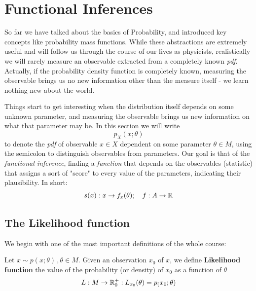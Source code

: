 \chapter{Functional Inferences}
So far we have talked about the basics of Probability, and introduced key concepts like probability mass functions. While these abstractions are extremely useful and will follow us through the course of our lives as physicists, realistically we will rarely measure an observable extracted from a completely known \emph{pdf}. Actually, if the probability density function is completely known, measuring the observable brings us no new information other than the measure itself - we learn nothing new about the world. 

Things start to get interesting when the distribution itself depends on some unknown parameter, and measuring the observable brings us new information on what that parameter may be. In this section we will write
	\[
	p_X(x;\theta)
	\]
to denote the \emph{pdf} of observable $x\in X$ dependent on some parameter $\theta\in M$, using the semicolon to distinguish observables from parameters. Our goal is that of the \emph{functional inference}, finding a \emph{function} that depends on the observables (statistic) that assigns a sort of "score" to every value of the parameters, indicating their plausibility. In short:
	\[
	s(x): x\rightarrow f_x(\theta); \quad f:A\rightarrow \mathbb{R}
	\]

\section{The Likelihood function}

We begin with one of the most important definitions of the whole course:

\begin{definition}
	Let $x\sim p(x;\theta)\, , \theta\in M$. Given an observation $x_0$ of $x$, we define \textbf{Likelihood function} the value of the probability (or density) of $x_0$ as a function of $\theta$
	\[
	L: M \rightarrow \mathbb{R}_0^+:L_{x_0}(\theta)=p_(x_0;\theta)
	\]
\end{definition}

